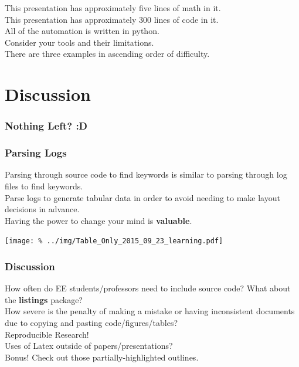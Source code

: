 
\begin{frame}
\centering
This presentation has approximately five
lines of math in it.
\\
This presentation has approximately 300
lines of code in it.
\\[2em]
All of the automation is written in python. \\
Consider your tools and their limitations.
\\[2em]
There are three examples in ascending order
of difficulty.  
\end{frame}

\begin{frame}
\tableofcontents
\end{frame}





\section*{Discussion}
\begin{frame}
\frametitle{Nothing Left? :D}
\tableofcontents[currentsection]
\end{frame}

\begin{frame}
\frametitle{Parsing Logs}
\begin{minipage}{.4\linewidth}
Parsing through source code to find keywords
is similar to parsing through log files to
find keywords.
\\[1em]
Parse logs to generate tabular data in order
to avoid needing to make layout decisions in
advance.
\\[1em]
Having the power to change your mind 
is {\bf valuable}.
\end{minipage}
\hfill
\begin{minipage}{.55\linewidth}
\texttt{[image: \%
../img/Table\_Only\_2015\_09\_23\_learning.pdf]}
\end{minipage}
\end{frame}

\begin{frame}
\frametitle{Discussion}
How often do EE students/professors need
to include source code?
What about the {\bf listings} package?
\\[1em]
How severe is the penalty of making a mistake
or having inconsistent documents due to
copying and pasting code/figures/tables?
\\[1em]
Reproducible Research!
\\[1em]
Uses of Latex outside of papers/presentations?
\\[1em]
Bonus!  Check out those partially-highlighted outlines.
\end{frame}

